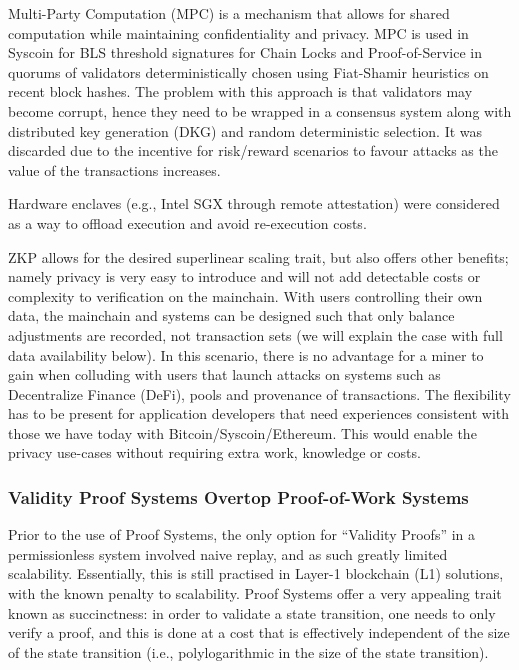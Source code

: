 \documentclass[peerreview]{ieeesyscoin}
\begin{document}
Multi-Party Computation (MPC) is a mechanism that allows for shared computation while maintaining confidentiality and privacy. MPC is used in Syscoin for BLS threshold signatures for Chain Locks and Proof-of-Service in quorums of validators deterministically chosen using Fiat-Shamir heuristics on recent block hashes. The problem with this approach is that validators may become corrupt, hence they need to be wrapped in a consensus system along with distributed key generation (DKG) and random deterministic selection. It was discarded due to the incentive for risk/reward scenarios to favour attacks as the value of the transactions increases.

Hardware enclaves (e.g., Intel SGX through remote attestation) were considered as a way to offload execution and avoid re-execution costs. 

ZKP allows for the desired superlinear scaling trait, but also offers other benefits; namely privacy is very easy to introduce and will not add detectable costs or complexity to verification on the mainchain. With users controlling their own data, the mainchain and systems can be designed such that only balance adjustments are recorded, not transaction sets (we will explain the case with full data availability below). In this scenario, there is no advantage for a miner to gain when colluding with users that launch attacks on systems such as Decentralize Finance (DeFi), pools and provenance of transactions. The flexibility has to be present for application developers that need experiences consistent with those we have today with Bitcoin/Syscoin/Ethereum. This would enable the privacy use-cases without requiring extra work, knowledge or costs.


\subsubsection{Validity Proof Systems Overtop Proof-of-Work Systems}

Prior to the use of Proof Systems, the only option for “Validity Proofs” in a permissionless system involved naive replay, and as such greatly limited scalability. Essentially, this is still practised in Layer-1 blockchain (L1) solutions, with the known penalty to scalability. Proof Systems offer a very appealing trait known as succinctness: in order to validate a state transition, one needs to only verify a proof, and this is done at a cost that is effectively independent of the size of the state transition (i.e., polylogarithmic in the size of the state transition).
\end{document}
